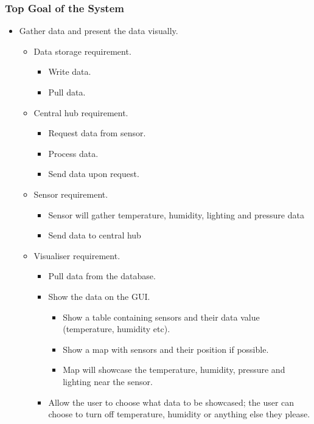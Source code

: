 \documentclass[../document]{subfiles}
\begin{document}
\subsubsection{Top Goal of the System}
\begin{itemize}
\item
Gather data and present the data visually.
\begin{itemize}
\item
Data storage requirement.
\begin{itemize}
\item
Write data.
\item
Pull data.
\end{itemize}
\item
Central hub requirement.
\begin{itemize}
\item
Request data from sensor.
\item
Process data.
\item
Send data upon request.
\end{itemize}
\item
Sensor requirement.
\begin{itemize}
\item
Sensor will gather temperature, humidity, lighting and pressure data
\item
Send data to central hub
\end{itemize}
\item
Visualiser requirement.
\begin{itemize}
\item
Pull data from the database.
\item
Show the data on the GUI.
\begin{itemize}
\item
Show a table containing sensors and their data value (temperature, humidity etc).
\item
Show a map with sensors and their position if possible.
\item
Map will showcase the temperature, humidity, pressure and lighting near the sensor.
\end{itemize}
\item
Allow the user to choose what data to be showcased; the user can choose to turn off temperature, humidity or anything else they please.
\end{itemize}
\end{itemize}
\end{itemize}
\end{document}
